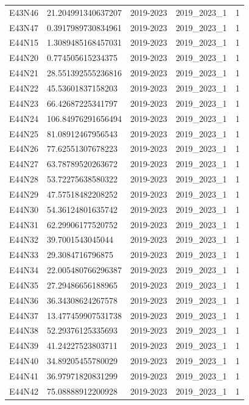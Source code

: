 \begin{landscape}
\begin{longtable}{lllll}
E43N46 & 21.204991340637207 & 2019-2023 & 2019\_2023\_1 & 1 \\
E43N47 & 0.3917989730834961 & 2019-2023 & 2019\_2023\_1 & 1 \\
E44N15 & 1.3089485168457031 & 2019-2023 & 2019\_2023\_1 & 1 \\
E44N20 & 0.774505615234375 & 2019-2023 & 2019\_2023\_1 & 1 \\
E44N21 & 28.551392555236816 & 2019-2023 & 2019\_2023\_1 & 1 \\
E44N22 & 45.53601837158203 & 2019-2023 & 2019\_2023\_1 & 1 \\
E44N23 & 66.42687225341797 & 2019-2023 & 2019\_2023\_1 & 1 \\
E44N24 & 106.84976291656494 & 2019-2023 & 2019\_2023\_1 & 1 \\
E44N25 & 81.08912467956543 & 2019-2023 & 2019\_2023\_1 & 1 \\
E44N26 & 77.62551307678223 & 2019-2023 & 2019\_2023\_1 & 1 \\
E44N27 & 63.78789520263672 & 2019-2023 & 2019\_2023\_1 & 1 \\
E44N28 & 53.72275638580322 & 2019-2023 & 2019\_2023\_1 & 1 \\
E44N29 & 47.57518482208252 & 2019-2023 & 2019\_2023\_1 & 1 \\
E44N30 & 54.36124801635742 & 2019-2023 & 2019\_2023\_1 & 1 \\
E44N31 & 62.29906177520752 & 2019-2023 & 2019\_2023\_1 & 1 \\
E44N32 & 39.7001543045044 & 2019-2023 & 2019\_2023\_1 & 1 \\
E44N33 & 29.3084716796875 & 2019-2023 & 2019\_2023\_1 & 1 \\
E44N34 & 22.005480766296387 & 2019-2023 & 2019\_2023\_1 & 1 \\
E44N35 & 27.29486656188965 & 2019-2023 & 2019\_2023\_1 & 1 \\
E44N36 & 36.34308624267578 & 2019-2023 & 2019\_2023\_1 & 1 \\
E44N37 & 13.477459907531738 & 2019-2023 & 2019\_2023\_1 & 1 \\
E44N38 & 52.29376125335693 & 2019-2023 & 2019\_2023\_1 & 1 \\
E44N39 & 41.24227523803711 & 2019-2023 & 2019\_2023\_1 & 1 \\
E44N40 & 34.89205455780029 & 2019-2023 & 2019\_2023\_1 & 1 \\
E44N41 & 36.97971820831299 & 2019-2023 & 2019\_2023\_1 & 1 \\
E44N42 & 75.08888912200928 & 2019-2023 & 2019\_2023\_1 & 1 \\

\end{longtable}
\end{landscape}
